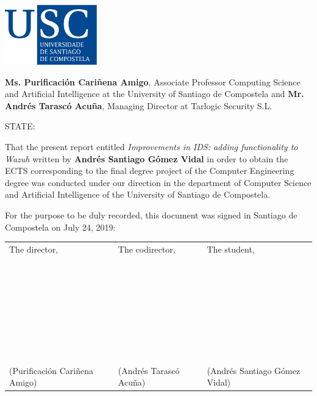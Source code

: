 \pagestyle{plain}
\includegraphics[width=4cm]{figuras/logo_usc.eps}

\vspace{1cm}
{\bf Ms. Purificación Cariñena Amigo}, Associate Professor Computing Science and Artificial Intelligence at the University of Santiago de Compostela and {\bf Mr. Andrés Tarascó Acuña}, Managing Director at Tarlogic Security S.L.

\vspace{1cm}
STATE:

\vspace{1cm}
That the present report entitled \textit{Improvements in IDS: adding functionality to Wazuh} written by \textbf{Andrés Santiago Gómez Vidal} in order to obtain the ECTS corresponding to the final degree project of the Computer Engineering degree was conducted under our direction in the department of Computer Science and Artificial Intelligence of the University of Santiago de Compostela.

\vspace{1cm}
For the purpose to be duly recorded, this document was signed in Santiago de Compostela on July 24, 2019:

\vspace{2cm}
\footnotesize
\begin{tabular}{lll}
The director, & The codirector, & The student, \\
~ \\
~ \\
~ \\
~ \\
~ \\
~ \\
~ \\
(Purificación Cariñena Amigo) & (Andrés Tarascó Acuña) & (Andrés Santiago Gómez Vidal)
\end{tabular}
\normalsize
